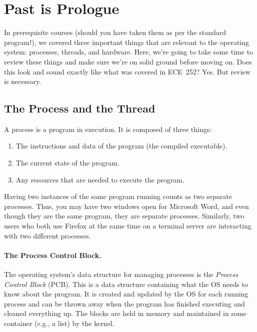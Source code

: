 




\section*{Past is Prologue}
In prerequisite courses (should you have taken them as per the standard program!), we covered three important things that are relevant to the operating system: processes, threads, and hardware. Here, we're going to take some time to review these things and make sure we're on solid ground before moving on. Does this look and sound exactly like what was covered in ECE~252? Yes. But review is necessary.

\subsection*{The Process and the Thread}

A process is a program in execution. It is composed of three things:

\begin{enumerate}
	\item The instructions and data of the program (the compiled executable).
	\item The current state of the program.
	\item Any resources that are needed to execute the program.
\end{enumerate}

Having two instances of the same program running counts as two separate processes. Thus, you may have two windows open for Microsoft Word, and even though they are the same program, they are separate processes. Similarly, two users who both use Firefox at the same time on a terminal server are interacting with two different processes.

\paragraph{The Process Control Block.}
 The operating system's data structure for managing processes is the \textit{Process Control Block} (PCB). This is a data structure containing what the OS needs to know about the program. It is created and updated by the OS for each running process and can be thrown away when the program has finished executing and cleaned everything up. The blocks are held in memory and maintained in some container (e.g., a list) by the kernel.

